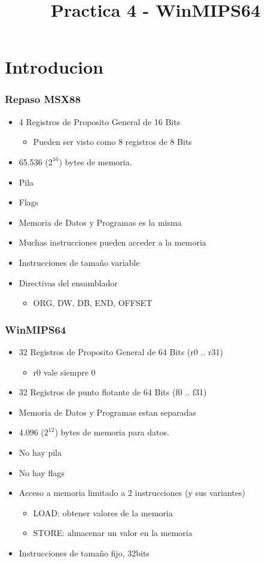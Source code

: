 \documentclass{beamer}
\title{Practica 4 - WinMIPS64}
\begin{document}
\begin{frame}
\titlepage
\end{frame}

\section{Introducion}

\begin{frame}
\frametitle{Repaso MSX88}
\begin{itemize}
 \item 4 Registros de Proposito General de 16 Bits
 \begin{itemize}
   \item Pueden ser visto como 8 registros de 8 Bits
 \end{itemize}
 \item 65.536 ($2^{16}$) bytes de memoria.
 \item Pila
 \item Flags
 \item Memoria de Datos y Programas es la misma
 \item Muchas instrucciones pueden acceder a la memoria
 \item Instrucciones de tamaño variable
 \item Directivas del ensamblador
 \begin{itemize}
   \item ORG, DW, DB, END, OFFSET
 \end{itemize}
 \end{itemize}
\end{frame}

\begin{frame}
\frametitle{WinMIPS64}
\begin{itemize}
 \item 32 Registros de Proposito General de 64 Bits (r0 .. r31)
 \begin{itemize}
   \item r0 vale siempre 0
 \end{itemize}
 \item 32 Registros de punto flotante de 64 Bits (f0 .. f31)
 \item Memoria de Datos y Programas estan separadas
 \item 4.096 ($2^{12}$) bytes de memoria para datos.
 \item No hay pila
 \item No hay flags
 \item Acceso a memoria limitado a 2 instrucciones (y sus variantes)
 \begin{itemize}
   \item LOAD: obtener valores de la memoria
   \item STORE: almacenar un valor en la memoria 
 \end{itemize}
 \item Instrucciones de tamaño fijo, 32bits
\end{itemize}

\end{frame}
\end{document}
